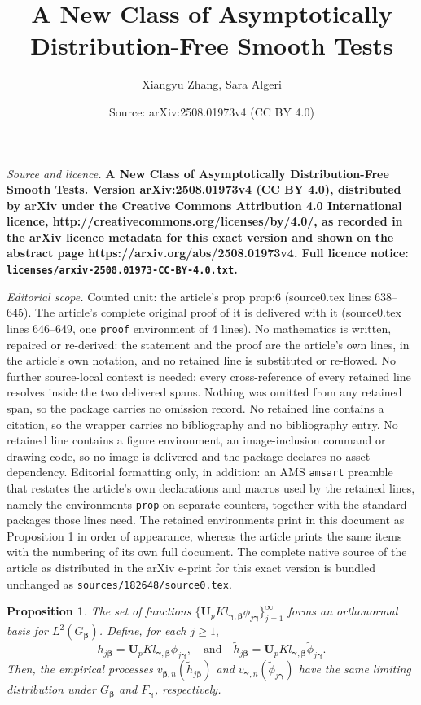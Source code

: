 \documentclass[10pt,a4paper]{amsart}
\title{\bf A New Class of Asymptotically Distribution-Free Smooth Tests}
\author{Xiangyu Zhang, Sara Algeri}
\date{Source: arXiv:2508.01973v4 (CC BY 4.0)}
\newtheorem{prop}{Proposition}
\newcommand{\hj}{h_{j\vect{\beta}}}
\newcommand{\phj}{\phi_{j\vect{\gamma}}}
\newcommand{\thj}{\widetilde{h}_{j\vect{\beta}}}
\newcommand{\tphj}{\widetilde{\phi}_{j\vect{\gamma}}}
\newcommand{\vect}[1]{\boldsymbol{#1}}
\begin{document}
\maketitle

\noindent\emph{Source and licence.} \bf A New Class of Asymptotically Distribution-Free Smooth Tests. Version arXiv:2508.01973v4 (CC BY 4.0), distributed by arXiv under the Creative Commons Attribution 4.0 International licence, http://creativecommons.org/licenses/by/4.0/, as recorded in the arXiv licence metadata for this exact version and shown on the abstract page https://arxiv.org/abs/2508.01973v4. Full licence notice: \texttt{licenses/arxiv-2508.01973-CC-BY-4.0.txt}.\par\smallskip

\noindent\textit{Editorial scope.} Counted unit: the article's prop prop:6 (source0.tex lines 638--645). The article's complete original proof of it is delivered with it (source0.tex lines 646--649, one \texttt{proof} environment of 4 lines). No mathematics is written, repaired or re-derived: the statement and the proof are the article's own lines, in the article's own notation, and no retained line is substituted or re-flowed.  No further source-local context is needed: every cross-reference of every retained line resolves inside the two delivered spans.  Nothing was omitted from any retained span, so the package carries no omission record.  No retained line contains a citation, so the wrapper carries no bibliography and no bibliography entry.  No retained line contains a figure environment, an image-inclusion command or drawing code, so no image is delivered and the package declares no asset dependency.  Editorial formatting only, in addition: an AMS \texttt{amsart} preamble that restates the article's own declarations and macros used by the retained lines, namely the environments \texttt{prop} on separate counters, together with the standard packages those lines need.  The retained environments print in this document as Proposition 1 in order of appearance, whereas the article prints the same items with the numbering of its own full document.  The complete native source of the article as distributed in the arXiv e-print for this exact version is bundled unchanged as \texttt{sources/182648/source0.tex}.
\begin{prop} \label{prop:6}
The set of functions $\{\vect{U}_{p}K l_{\vect{\gamma},\vect{\beta}} \phj\}_{j=1}^\infty$ forms an orthonormal basis for $L^2(G_{\vect{\beta}})$. 
Define, for each $j \geq 1, $ 
\begin{equation*}
\hj = \vect{U}_{p}K l_{\vect{\gamma},\vect{\beta}} \phj, \quad \text{and} \quad \thj = \vect{U}_{p}K l_{\vect{\gamma},\vect{\beta}} \tphj.
\end{equation*}
Then, the empirical processes $v_{\vect{\beta},n}(\thj)$ and $v_{\vect{\gamma},n}(\tphj)$ have the same limiting distribution under $G_{\vect{\beta}}$ and $F_{\vect{\gamma}}$, respectively.
\end{prop} 
\end{document}
